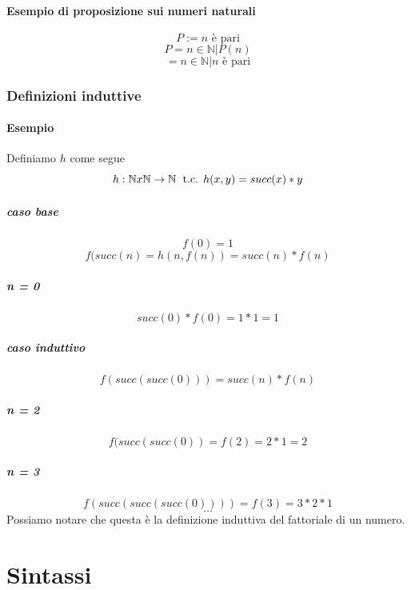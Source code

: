 \documentclass[a4paper,12pt]{report}
\begin{document}
\subsubsection{Esempio di proposizione sui numeri naturali}
\[P:= n \text{ \`{e} pari} \]
\[ P = {n \in \mathbb{N} | P(n) } \]
\[ = {n \in \mathbb{N} | n \text{ \`{e} pari}} \] 

\subsection{Definizioni induttive}

\subsubsection{Esempio}
Definiamo $h$ come segue
\[ h: \mathbb{N}x\mathbb{N} \rightarrow \mathbb{N}\thickspace \text{ t.c. }  h(x,y) = succ(x) * y \]

\paragraph{caso base} \[f(0) = 1 \]
\[f(succ(n) = h(n, f(n)) = succ(n) * f(n) \]

\paragraph{n = 0}
\[ succ(0) * f(0) = 1 * 1 = 1 \]

\paragraph{caso induttivo}
\[ f(succ(succ(0))) = succ(n) * f(n) \]

\paragraph{n = 2}
\[ f(succ(succ(0)) = f(2) = 2 * 1 = 2 \]
\paragraph{n = 3}
\[ f(succ(succ(succ(0)))) = f(3) = 3 * 2 * 1 \]
\[ \dots \]
Possiamo notare che questa \`{e} la definizione induttiva del fattoriale di un numero.
\chapter{Sintassi}
\end{document}
